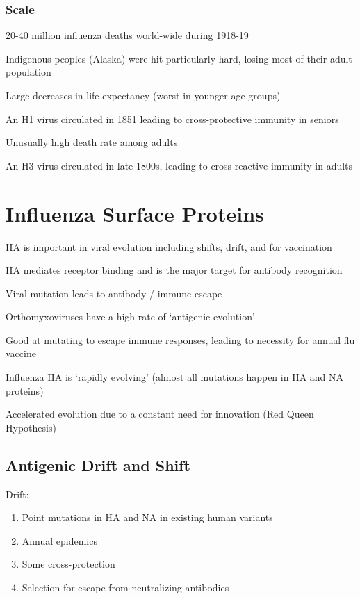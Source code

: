 \documentclass{notes}
\begin{document}
\subsubsection{Scale}

20-40 million influenza deaths world-wide during 1918-19

Indigenous peoples (Alaska) were hit particularly hard, losing most of their adult population

Large decreases in life expectancy (worst in younger age groups)

\tab An H1 virus circulated in 1851 leading to cross-protective immunity in seniors

Unusually high death rate among adults

\tab An H3 virus circulated in late-1800s, leading to cross-reactive immunity in adults

\section{Influenza Surface Proteins}

HA is important in viral evolution including shifts, drift, and for vaccination

\tab HA mediates receptor binding and is the major target for antibody recognition

\tab \indicates Viral mutation leads to antibody / immune escape

Orthomyxoviruses have a high rate of `antigenic evolution'

\tab Good at mutating to escape immune responses, leading to necessity for annual flu vaccine

Influenza HA is `rapidly evolving' (almost all mutations happen in HA and NA proteins)

\tab Accelerated evolution due to a constant need for innovation (Red Queen Hypothesis)

\subsection{Antigenic Drift and Shift}

Drift:

\begin{enumerate}
    \item Point mutations in HA and NA in existing human variants
    \item Annual epidemics
    \item Some cross-protection
    \item Selection for escape from neutralizing antibodies
\end{enumerate}
\end{document}
